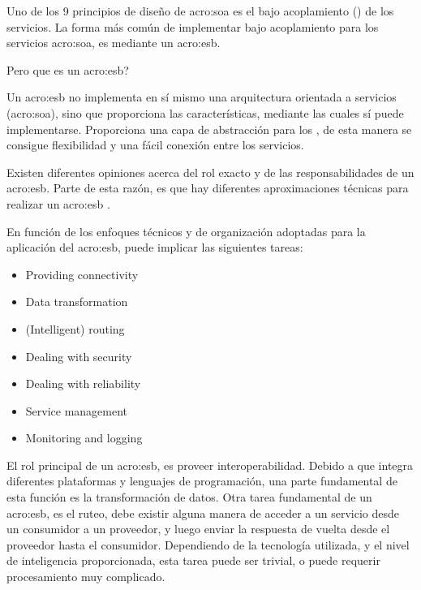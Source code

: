 

Uno de los 9 principios de diseño de \gls{acro:soa} es el bajo acoplamiento () de los servicios.  La forma más común de implementar bajo acoplamiento para los servicios \gls{acro:soa}, es mediante un \gls{acro:esb}.

Pero que es un \gls{acro:esb}?

Un \gls{acro:esb} no implementa en sí mismo una arquitectura orientada a servicios (\gls{acro:soa}), sino que proporciona las características, mediante las cuales sí puede implementarse.  Proporciona una capa de abstracción para los , de esta manera se consigue flexibilidad y una fácil conexión entre los servicios.

Existen diferentes opiniones acerca del rol exacto y de las responsabilidades de un \gls{acro:esb}.  Parte de esta razón, es que hay diferentes aproximaciones técnicas para realizar un \gls{acro:esb} \cite[p.~47]{josuttis2007}.

En función de los enfoques técnicos y de organización adoptadas para la aplicación del \gls{acro:esb}, puede implicar las siguientes tareas:

\begin{itemize}
  \item Providing connectivity
  \item Data transformation
  \item (Intelligent) routing
  \item Dealing with security
  \item Dealing with reliability
  \item Service management
  \item Monitoring and logging
\end{itemize}

El rol principal de un \gls{acro:esb}, es proveer interoperabilidad.  Debido a que integra diferentes plataformas y lenguajes de programación, una parte fundamental de esta función es la transformación de datos.
Otra tarea fundamental de un \gls{acro:esb}, es el ruteo, debe existir alguna manera de acceder a un servicio desde un consumidor a un proveedor, y luego enviar la respuesta de vuelta desde el proveedor hasta el consumidor.
Dependiendo de la tecnología utilizada, y el nivel de inteligencia proporcionada, esta tarea puede ser trivial, o puede requerir procesamiento muy complicado.

